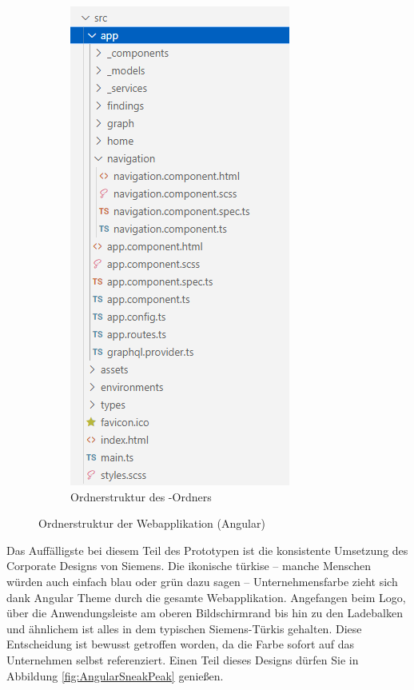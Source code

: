 \begin{figure}
\begin{subfigure}{.5\textwidth}
        \includegraphics[width=.65\linewidth]{content/img/Empire/Frontend/Angular_Directory_Structure_Prototype_2.png}
        \caption{Ordnerstruktur des -Ordners}
        \label{fig:AngularDirectoryStructurePrototype2}
    \end{subfigure}
    \caption{Ordnerstruktur der Webapplikation (Angular)}
    \label{fig:AngularDirectoryStructurePrototype}
\end{figure}
\FloatBarrier

Das Auffälligste bei diesem Teil des Prototypen ist die konsistente Umsetzung des Corporate Designs von Siemens. Die ikonische türkise -- manche Menschen würden auch einfach blau oder grün dazu sagen -- Unternehmensfarbe zieht sich dank Angular Theme durch die gesamte Webapplikation. Angefangen beim Logo, über die Anwendungsleiste am oberen Bildschirmrand bis hin zu den Ladebalken und ähnlichem ist alles in dem typischen Siemens-Türkis gehalten. Diese Entscheidung ist bewusst getroffen worden, da die Farbe sofort auf das Unternehmen selbst referenziert. Einen Teil dieses Designs dürfen Sie in Abbildung \ref{fig:AngularSneakPeak} genießen.

